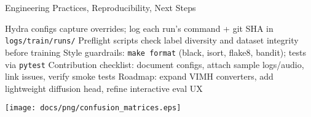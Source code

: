 \begin{slide}[\slideopts,toc={Practices}]{Engineering Practices, Reproducibility, Next Steps}
  \vspace{-0.75em}
  \begin{itemize}
    \mpitem Hydra configs capture overrides; log each run's command + git SHA in \texttt{logs/train/runs/}
    \mpitem Preflight scripts check label diversity and dataset integrity before training
    \mpitem Style guardrails: \texttt{make format} (black, isort, flake8, bandit); tests via \texttt{pytest}
    \mpitem Contribution checklist: document configs, attach sample logs/audio, link issues, verify smoke tests
    \mpitem Roadmap: expand VIMH converters, add lightweight diffusion head, refine interactive eval UX
  \end{itemize}
  \vspace{0.25em}
  \begin{center}
    \texttt{[image: docs/png/confusion\_matrices.eps]}
  \end{center}
\end{slide}
